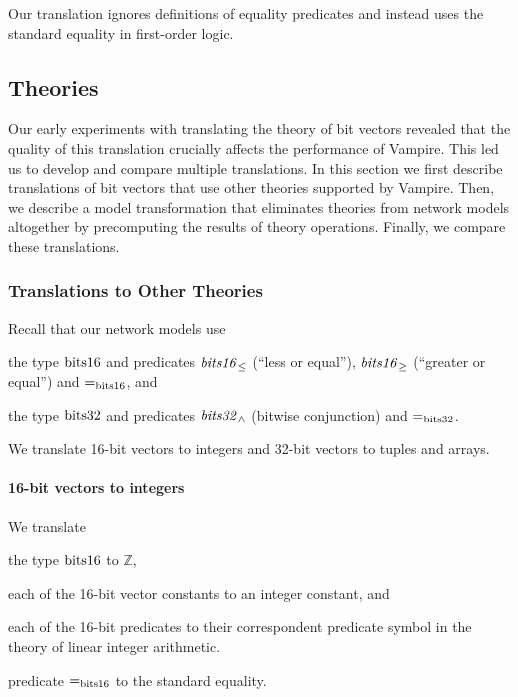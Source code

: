 Our translation ignores definitions of equality predicates and instead uses the standard equality in first-order logic. %

\subsection{Theories}
\label{sect:aws/fol/theories}
Our early experiments with translating the theory of bit vectors revealed that the quality of this translation crucially affects the performance of Vampire. This led us to develop and compare multiple translations. In this section we first describe translations of bit vectors that use other theories supported by Vampire. Then, we describe a model transformation that eliminates theories from network models altogether by precomputing the results of theory operations. Finally, we compare these translations.

\subsubsection*{Translations to Other Theories}
Recall that our network models use
\begin{enumerate*}[label=(\roman*)]
  \item the type $\mathrm{bits16}$ and predicates $\mathit{bits16}_{\le}$ (``less or equal''), $\mathit{bits16}_{\ge}$ (``greater or equal'') and $\mathit{=}_{\mathrm{bits16}}$, and
  \item the type $\mathrm{bits32}$ and predicates $\mathit{bits32}_\wedge$ (bitwise conjunction) and $\mathit{=}_{\mathrm{bits32}}$.
\end{enumerate*}
We translate 16-bit vectors to integers and 32-bit vectors to tuples and arrays.

\paragraph{16-bit vectors to integers}
We translate
\begin{enumerate*}[label=(\roman*)]
  \item the type $\mathrm{bits16}$ to $\mathbb{Z}$,
  \item each of the 16-bit vector constants to an integer constant, and
  \item each of the 16-bit predicates to their correspondent predicate symbol in the theory of linear integer arithmetic.
  \item predicate $\mathit{=}_{\mathrm{bits16}}$ to the standard equality.
\end{enumerate*}

